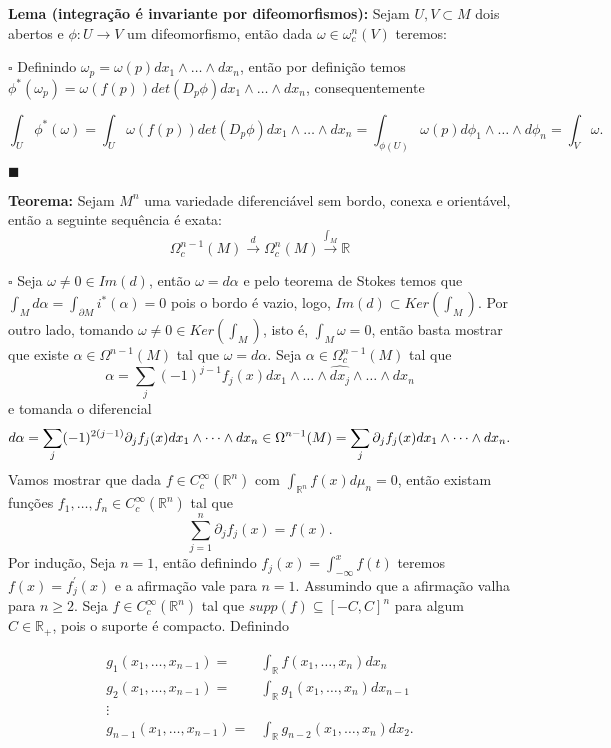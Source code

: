 \documentclass{article}
\begin{document}
	\vspace{2mm}
	\textbf{Lema (integração é invariante por difeomorfismos):} Sejam $U,V \subset M$ dois abertos e $\phi : U \to V $ um difeomorfismo, então dada $\omega \in \omega^{n}_{c}(V)$ teremos:
	
	$\square$ Definindo $\omega_{p} = \omega(p) dx_{1} \wedge \dots \wedge dx_{n}$, então por definição temos $\phi^{*}(\omega_{p}) = \omega(f(p))det(D_{p}\phi) dx_{1} \wedge \dots \wedge dx_{n}$, consequentemente
	
	$$
	\int_{U} \phi^{*}(\omega) = \int_{U} \omega(f(p))det(D_{p}\phi) dx_{1} \wedge \dots \wedge dx_{n} = \int_{\phi(U)}\omega(p) d\phi_{1} \wedge \dots \wedge d\phi_{n} = \int_{V} \omega.
	$$
	
	$\blacksquare$
	
	\vspace{2mm}
	\textbf{Teorema:} Sejam $M^{n}$ uma variedade diferenciável sem bordo, conexa e orientável, então a seguinte sequência é exata:
	$$
	\Omega^{n-1}_{c}(M) \xrightarrow{d} \Omega^{n}_{c}(M) \xrightarrow{\int_{M}} \mathbb{R}
	$$
	
	$\square$ Seja $\omega \neq 0 \in Im(d)$, então $\omega = d\alpha $ e pelo teorema de Stokes temos que $\int_{M} d\alpha = \int_{\partial M} i^{*}(\alpha) = 0$ pois o bordo é vazio, logo, $Im(d) \subset Ker(\int_{M})$. Por outro lado, tomando $\omega \neq 0 \in Ker(\int_{M})$, isto é, $\int_{M} \omega = 0$, então basta mostrar que existe $\alpha \in \Omega^{n-1}(M)$ tal que $\omega = d\alpha$. Seja $\alpha \in \Omega_{c}^{n-1}(M)$ tal que
	$$
	\alpha = \sum_{j} (-1)^{j-1}f_{j}(x) dx_{1} \wedge \dots \wedge \hat{dx_{j}} \wedge \dots \wedge dx_{n}
	$$	
	e tomanda o diferencial
	$$
	d\alpha = \sum_{j} (-1)^{2(j-1)}\partial_{j}f_{j}(x) dx_{1} \wedge \dots \wedge dx_{n}\in \Omega^{n-1}(M)
	\\
	= \sum_{j} \partial_{j}f_{j}(x) dx_{1} \wedge \dots \wedge dx_{n}.
	$$
	Vamos mostrar que dada $f \in C^{\infty}_{c}(\mathbb{R}^{n})$ com $\int_{\mathbb{R}^{n}} f(x)d\mu_{n} = 0$, então existam funções $f_{1}, \dots, f_{n} \in C^{\infty}_{c}(\mathbb{R}^{n})$ tal que 
	$$
	\sum_{j=1}^{n} \partial_{j}f_{j}(x) = f(x).
	$$
	Por indução, Seja $n=1$, então definindo $f_{j}(x) = \int_{-\infty}^{x}f(t)$ teremos $f(x) = f^{'}_{j}(x)$ e a afirmação vale para $n=1$. Assumindo que a afirmação valha para $n \geq 2$. Seja $f \in C^{\infty}_{c}(\mathbb{R}^{n})$ tal que $supp(f) \subseteq [-C, C]^{n}$ para algum $C \in \mathbb{R}_{+}$, pois o suporte é compacto. Definindo 
	
	$$
	\begin{aligned}
	g_{1}(x_{1}, \dots, x_{n-1}) 
	=& \int_{\mathbb{R}} f(x_{1}, \dots, x_{n})dx_{n}
	\\
	g_{2}(x_{1}, \dots, x_{n-1}) 
	=& \int_{\mathbb{R}} g_{1}(x_{1}, \dots, x_{n})dx_{n-1}
	\\
	\vdots &
	\\
	g_{n-1}(x_{1}, \dots, x_{n-1})
	=& \int_{\mathbb{R}} g_{n-2}(x_{1}, \dots, x_{n})dx_{2}.
	\end{aligned}
	$$
	
\end{document}

